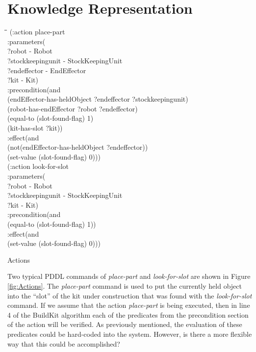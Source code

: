 \section{Knowledge Representation}
\label{sect:knowledge}
%
\begin{algorithm}[h!]
\begin{tabbing}
\hspace*{.5cm}\=\hspace*{.5cm}\= \hspace*{.5cm}\= \kill
(:action place-part\\
\>	:parameters(\\
\>\>	?robot - Robot\\
\>\>	?stockkeepingunit - StockKeepingUnit\\
\>\>	?endeffector - EndEffector\\
\>\>	?kit - Kit)\\
\>	:precondition(and\\
\>\>	(endEffector-has-heldObject ?endeffector ?stockkeepingunit)\\
\>\>	(robot-has-endEffector ?robot ?endeffector)\\
\>\>	(equal-to (slot-found-flag) 1)\\
\>\>	(kit-has-slot ?kit))\\
\>	:effect(and\\
\>\>	(not(endEffector-has-heldObject ?endeffector))\\
\>\>	(set-value (slot-found-flag) 0)))\\
(:action look-for-slot\\
\>	:parameters(\\
\>\>	?robot - Robot\\
\>\>	?stockkeepingunit - StockKeepingUnit\\
\>\>	?kit - Kit)\\
\>	:precondition(and\\
\>\>	(equal-to (slot-found-flag) 1))\\
\>	:effect(and\\
\>\>	(set-value (slot-found-flag) 0)))\\
\end{tabbing}
\caption{Actions}
\label{fig:Actions}
\end{algorithm}
%
Two typical PDDL commands of {\it place-part} and {\it look-for-slot} 
are shown in Figure \ref{fig:Actions}. The {\it place-part} command
is used to put the currently held object into the ``slot'' of the kit
under construction that was found with the {\it look-for-slot} command.
If we assume that the action
{\it place-part} is being executed, then in line 4 of the {\sc BuildKit} algorithm
each of the predicates from the precondition section of the action 
will be verified. As previously mentioned, the evaluation of these predicates
could be hard-coded into the system. However, is there a more flexible way
that this could be accomplished?

